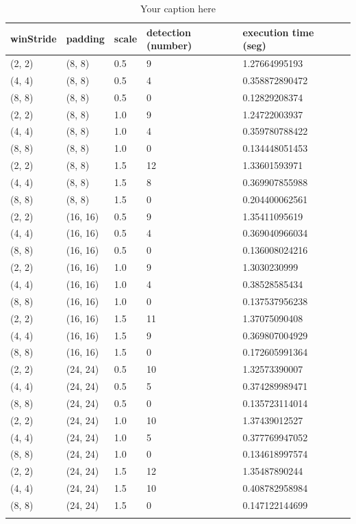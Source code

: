 \begin{longtable}{|l|l|l|l|l|l|} 
	\hline
	\textbf{winStride} & \textbf{padding} & \textbf{scale} & \textbf{detection (number)} & \textbf{execution time (seg)} \\ \hline
(2, 2) & (8, 8) & 0.5 & 9 & 1.27664995193 \\ \hline
(4, 4) & (8, 8) & 0.5 & 4 & 0.358872890472 \\ \hline
(8, 8) & (8, 8) & 0.5 & 0 & 0.12829208374 \\ \hline
(2, 2) & (8, 8) & 1.0 & 9 & 1.24722003937 \\ \hline
(4, 4) & (8, 8) & 1.0 & 4 & 0.359780788422 \\ \hline
(8, 8) & (8, 8) & 1.0 & 0 & 0.134448051453 \\ \hline
(2, 2) & (8, 8) & 1.5 & 12 & 1.33601593971 \\ \hline
(4, 4) & (8, 8) & 1.5 & 8 & 0.369907855988 \\ \hline
(8, 8) & (8, 8) & 1.5 & 0 & 0.204400062561 \\ \hline
(2, 2) & (16, 16) & 0.5 & 9 & 1.35411095619 \\ \hline
(4, 4) & (16, 16) & 0.5 & 4 & 0.369040966034 \\ \hline
(8, 8) & (16, 16) & 0.5 & 0 & 0.136008024216 \\ \hline
(2, 2) & (16, 16) & 1.0 & 9 & 1.3030230999 \\ \hline
(4, 4) & (16, 16) & 1.0 & 4 & 0.38528585434 \\ \hline
(8, 8) & (16, 16) & 1.0 & 0 & 0.137537956238 \\ \hline
(2, 2) & (16, 16) & 1.5 & 11 & 1.37075090408 \\ \hline
(4, 4) & (16, 16) & 1.5 & 9 & 0.369807004929 \\ \hline
(8, 8) & (16, 16) & 1.5 & 0 & 0.172605991364 \\ \hline
(2, 2) & (24, 24) & 0.5 & 10 & 1.32573390007 \\ \hline
(4, 4) & (24, 24) & 0.5 & 5 & 0.374289989471 \\ \hline
(8, 8) & (24, 24) & 0.5 & 0 & 0.135723114014 \\ \hline
(2, 2) & (24, 24) & 1.0 & 10 & 1.37439012527 \\ \hline
(4, 4) & (24, 24) & 1.0 & 5 & 0.377769947052 \\ \hline
(8, 8) & (24, 24) & 1.0 & 0 & 0.134618997574 \\ \hline
(2, 2) & (24, 24) & 1.5 & 12 & 1.35487890244 \\ \hline
(4, 4) & (24, 24) & 1.5 & 10 & 0.408782958984 \\ \hline
(8, 8) & (24, 24) & 1.5 & 0 & 0.147122144699 \\ \hline


	\caption{Your caption here} %
	\label{tab:myfirstlongtable}
\end{longtable}






